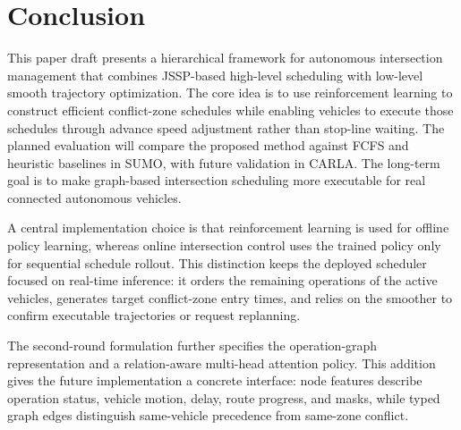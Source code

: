 \section{Conclusion}
\label{sec:conclusion}

This paper draft presents a hierarchical framework for autonomous intersection management that combines JSSP-based high-level scheduling with low-level smooth trajectory optimization. The core idea is to use reinforcement learning to construct efficient conflict-zone schedules while enabling vehicles to execute those schedules through advance speed adjustment rather than stop-line waiting. The planned evaluation will compare the proposed method against FCFS and heuristic baselines in SUMO, with future validation in CARLA. The long-term goal is to make graph-based intersection scheduling more executable for real connected autonomous vehicles.

\begin{addedblock}
A central implementation choice is that reinforcement learning is used for offline policy learning, whereas online intersection control uses the trained policy only for sequential schedule rollout. This distinction keeps the deployed scheduler focused on real-time inference: it orders the remaining operations of the active vehicles, generates target conflict-zone entry times, and relies on the smoother to confirm executable trajectories or request replanning.
\end{addedblock}


\begin{addedtwoblock}
The second-round formulation further specifies the operation-graph representation and a relation-aware multi-head attention policy. This addition gives the future implementation a concrete interface: node features describe operation status, vehicle motion, delay, route progress, and masks, while typed graph edges distinguish same-vehicle precedence from same-zone conflict.
\end{addedtwoblock}


